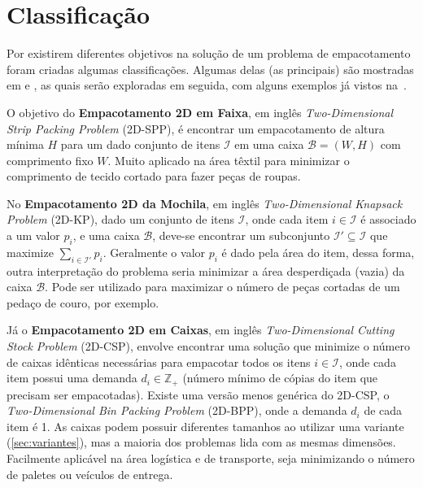 \section{Classificação}\label{sec:classificacao}

Por existirem diferentes objetivos na solução de um problema de empacotamento foram criadas algumas
classificações.
Algumas delas (as principais) são mostradas em  e
, as quais serão exploradas em seguida, com alguns exemplos já vistos
na~.

O objetivo do \textbf{Empacotamento 2D em Faixa}, em inglês \textit{Two-Dimensional Strip Packing
Problem} (2D-SPP), é encontrar um empacotamento de altura mínima $H$ para um dado conjunto de itens
$\mathcal{I}$ em uma caixa $\mathcal{B} = (W, H)$ com comprimento fixo $W$.
Muito aplicado na área têxtil para minimizar o comprimento de tecido cortado para fazer peças
de roupas.

No \textbf{Empacotamento 2D da Mochila}, em inglês \textit{Two-Dimensional Knapsack Problem} (2D-KP),
dado um conjunto de itens $\mathcal{I}$, onde cada item $i \in \mathcal{I}$ é associado a um valor
$p_i$, e uma caixa $\mathcal{B}$, deve-se encontrar um subconjunto $\mathcal{I}' \subseteq
\mathcal{I}$ que maximize $\sum_{i \in \mathcal{I'}}^{} p_i$.
Geralmente o valor $p_i$ é dado pela área do item, dessa forma, outra interpretação do problema
seria minimizar a área desperdiçada (vazia) da caixa $\mathcal{B}$.
Pode ser utilizado para maximizar o número de peças cortadas de um pedaço de couro, por exemplo.


Já o \textbf{Empacotamento 2D em Caixas}, em inglês \textit{Two-Dimensional Cutting Stock Problem}
(2D-CSP), envolve encontrar uma solução que minimize o número de caixas idênticas necessárias para
empacotar todos os itens $i \in \mathcal{I}$, onde cada item possui uma demanda
$d_i \in \mathbb{Z}_+$ (número mínimo de cópias do item que precisam ser empacotadas).
Existe uma versão menos genérica do 2D-CSP, o \textit{Two-Dimensional Bin Packing Problem} (2D-BPP),
onde a demanda $d_i$ de cada item é 1.
As caixas podem possuir diferentes tamanhos ao utilizar uma variante (\cref{sec:variantes}),
mas a maioria dos problemas lida com as mesmas dimensões.
Facilmente aplicável na área logística e de transporte, seja minimizando o número de paletes
ou veículos de entrega.

